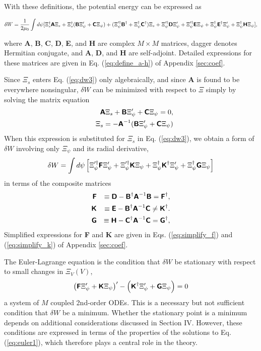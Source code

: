 \documentclass[prb,twocolumn,showpacs,preprintnumbers,amsmath,amssymb]{revtex4}
\renewcommand*{\t}[1]{\hbox{\sffamily\bfseries #1}}
\begin{document}
With these definitions, the potential energy can be expressed as 
\begin{widetext}
\begin{equation}
\delta W = \frac{1}{2 \mu_0} \int d\psi [
	\Xi_s^\dagger \t{A} \Xi_s 
	+ \Xi_s^\dagger (\t{B} \Xi_\psi' + \t{C} \Xi_\psi)
	+ (\Xi_\psi'^\dagger \t{B}^\dagger
	+ \Xi_\psi^\dagger \t{C}^\dagger) \Xi_s
	+ \Xi_\psi'^\dagger \t{D} \Xi_\psi'
	+ \Xi_\psi'^\dagger \t{E} \Xi_\psi
	+ \Xi_\psi^\dagger \t{E}^\dagger \Xi_\psi'
	+ \Xi_\psi^\dagger \t{H} \Xi_\psi ],
\label{eq:dw3}
\end{equation}
\end{widetext}
where \t{A}, \t{B}, \t{C}, \t{D}, \t{E}, and \t{H} are complex $M \times
M$ matrices, dagger denotes Hermitian conjugate, and \t{A}, \t{D}, and
\t{H} are self-adjoint.  Detailed expressions for these matrices are
given in Eq. (\ref{eq:define_a-h}) of Appendix \ref{sec:coef}.

Since $\Xi_s$ enters Eq. (\ref{eq:dw3}) only algebraically, and since
\t{A} is found to be everywhere nonsingular, $\delta W$ can be minimized
with respect to $\Xi$ simply by solving the matrix equation
\begin{eqnarray}
&&\t{A} \Xi_s + \t{B} \Xi_\psi' + \t{C} \Xi_\psi = 0, \nonumber \\
&&\Xi_s = - \t{A}^{-1} (\t{B} \Xi_\psi' + \t{C} \Xi_\psi)
\end{eqnarray}
When this expression is substituted for $\Xi_s$ in Eq. (\ref{eq:dw3}),
we obtain a form of $\delta W$ involving only $\Xi_\psi$ and its radial
derivative,
\begin{equation}
\delta W = \int d\psi \left[
\Xi_\psi'^\dagger \t{F} \Xi_\psi'
+ \Xi_\psi'^\dagger \t{K} \Xi_\psi
+ \Xi_\psi^\dagger \t{K}^\dagger \Xi_\psi'
+ \Xi_\psi^\dagger \t{G} \Xi_\psi \right]
\label{eq:dw4}
\end{equation}
in terms of the composite matrices
\begin{eqnarray}
\t{F} &&\equiv \t{D} - \t{B}^\dagger \t{A}^{-1} \t{B} = \t{F}^\dagger, \nonumber \\
\t{K} &&\equiv \t{E} - \t{B}^\dagger \t{A}^{-1} \t{C} \ne \t{K}^\dagger. \nonumber \\
\t{G} &&\equiv \t{H} - \t{C}^\dagger \t{A}^{-1} \t{C} = \t{G}^\dagger, 
\label{eq:define_fkg}
\end{eqnarray}
Simplified expressions for \t{F} and \t{K} are given in
Eqs. (\ref{eq:simplify_f}) and (\ref{eq:simplify_k}) of Appendix
\ref{sec:coef}.

The Euler-Lagrange equation is the condition that $\delta W$ be
stationary with respect to small changes in $\Xi_V(V)$,
\begin{equation}
\left( \t{F} \Xi_\psi' + \t{K} \Xi_\psi \right)' - \left( \t{K}^\dagger
\Xi_\psi' + \t{G} \Xi_\psi \right) = 0
\label{eq:euler1}
\end{equation}
a system of $M$ coupled 2nd-order ODEs.  This is a necessary but not
sufficient condition that $\delta W$ be a minimum.  Whether the
stationary point is a minimum depends on additional considerations
discussed in Section IV.  However, these conditions are expressed in
terms of the properties of the solutions to Eq. (\ref{eq:euler1}), which
therefore plays a central role in the theory.
\end{document}
